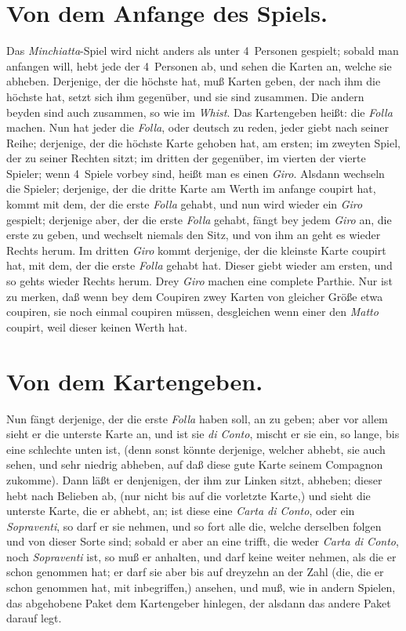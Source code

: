 \documentclass[11pt,a6paper,twoside]{article}
\begin{document}
\section{Von dem Anfange des Spiels.}

Das \textit{Minchiatta}-Spiel wird nicht anders als unter 4~Personen gespielt; sobald man anfangen will, hebt jede der 4~Personen ab, und sehen die Karten an, welche sie abheben. Derjenige, der die höchste hat, muß Karten geben, der nach ihm die höchste hat, setzt sich ihm gegenüber, und sie sind zusammen. Die andern beyden sind auch zusammen, so wie im \textit{Whist}. Das Kartengeben heißt: die \textit{Folla} machen. Nun hat jeder die \textit{Folla}, oder deutsch zu reden, jeder giebt nach seiner Reihe; derjenige, der die höchste Karte gehoben hat, am ersten; im zweyten Spiel, der zu seiner Rechten sitzt; im dritten der gegenüber, im vierten der vierte Spieler; wenn 4~Spiele vorbey sind, heißt man es einen \textit{Giro}. Alsdann wechseln die Spieler; derjenige, der die dritte Karte am Werth im anfange coupirt hat, kommt mit dem, der die erste \textit{Folla} gehabt, und nun wird wieder ein \textit{Giro} gespielt; derjenige aber, der die erste \textit{Folla} gehabt, fängt bey jedem \textit{Giro} an, die erste zu geben, und wechselt niemals den Sitz, und von ihm an geht es wieder Rechts herum. Im dritten \textit{Giro} kommt derjenige, der die kleinste Karte coupirt hat, mit dem, der die erste \textit{Folla} gehabt hat. Dieser giebt wieder am ersten, und so gehts wieder Rechts herum. Drey \textit{Giro} machen eine complete Parthie. Nur ist zu merken, daß wenn bey dem Coupiren zwey Karten von gleicher Größe etwa coupiren, sie noch einmal coupiren müssen, desgleichen wenn einer den \textit{Matto} coupirt, weil dieser keinen Werth hat.


\section{Von dem Kartengeben.}

Nun fängt derjenige, der die erste \textit{Folla} haben soll, an zu geben; aber vor allem sieht er die unterste Karte an, und ist sie \textit{di Conto}, mischt er sie ein, so lange, bis eine schlechte unten ist, (denn sonst könnte derjenige, welcher abhebt, sie auch sehen, und sehr niedrig abheben, auf daß diese gute Karte seinem Compagnon zukomme). Dann läßt er denjenigen, der ihm zur Linken sitzt, abheben; dieser hebt nach Belieben ab, (nur nicht bis auf die vorletzte Karte,) und sieht die unterste Karte, die er abhebt, an; ist diese eine \textit{Carta di Conto}, oder ein \textit{Sopraventi}, so darf er sie nehmen, und so fort alle die, welche derselben folgen und von dieser Sorte sind; sobald er aber an eine trifft, die weder \textit{Carta di Conto}, noch \textit{Sopraventi} ist, so muß er anhalten, und darf keine weiter nehmen, als die er schon genommen hat; er darf sie aber bis auf dreyzehn an der Zahl (die, die er schon genommen hat, mit inbegriffen,) ansehen, und muß, wie in andern Spielen, das abgehobene Paket dem Kartengeber hinlegen, der alsdann das andere Paket darauf legt.
\end{document}
